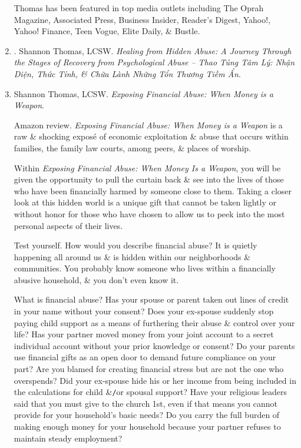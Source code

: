 \documentclass{article}
\begin{document}
\begin{enumerate}
	{\sc Thomas} has been featured in top media outlets including The Oprah Magazine, Associated Press, Business Insider, Reader's Digest, Yahoo!, Yahoo! Finance, Teen Vogue, Elite Daily, \& Bustle.
	
	\item \cite{Thomas_psychological_manipulation_VN}. {\sc Shannon Thomas, LCSW}. {\it Healing from Hidden Abuse: A Journey Through the Stages of Recovery from Psychological Abuse -- Thao Túng Tâm Lý: Nhận Diện, Thức Tỉnh, \& Chữa Lành Những Tổn Thương Tiềm Ẩn}.\hfill{\sf[done]}
	
	\item {\sc Shannon Thomas, LCSW}. {\it Exposing Financial Abuse: When Money is a Weapon}. {}
	
	{\sf Amazon review.} {\it Exposing Financial Abuse: When Money is a Weapon} is a raw \& shocking expos\'e of economic exploitation \& abuse that occurs within families, the family law courts, among peers, \& places of worship.
	
	Within {\it Exposing Financial Abuse: When Money Is a Weapon}, you will be given the opportunity to pull the curtain back \& see into the lives of those who have been financially harmed by someone close to them. Taking a closer look at this hidden world is a unique gift that cannot be taken lightly or without honor for those who have chosen to allow us to peek into the most personal aspects of their lives.
	
	Test yourself. How would you describe financial abuse? It is quietly happening all around us \& is hidden within our neighborhoods \& communities. You probably know someone who lives within a financially abusive household, \& you don't even know it.
	
	What is financial abuse? Has your spouse or parent taken out lines of credit in your name without your consent? Does your ex-spouse suddenly stop paying child support as a means of furthering their abuse \& control over your life? Has your partner moved money from your joint account to a secret individual account without your prior knowledge or consent? Do your parents use financial gifts as an open door to demand future compliance on your part? Are you blamed for creating financial stress but are not the one who overspends? Did your ex-spouse hide his or her income from being included in the calculations for child \&{\tt/}or spousal support? Have your religious leaders said that you must give to the church 1st, even if that means you cannot provide for your household's basic needs? Do you carry the full burden of making enough money for your household because your partner refuses to maintain steady employment?
	

\end{enumerate}
\end{document}
